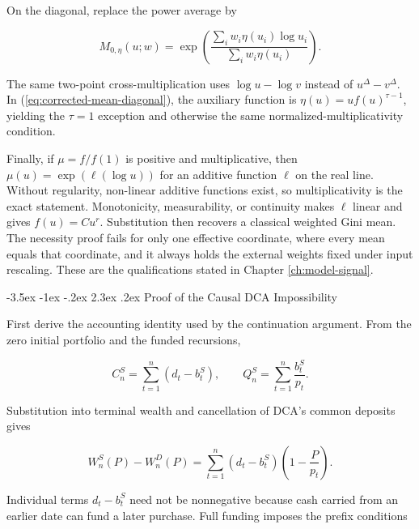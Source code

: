 \documentclass[12pt,a4paper,oneside]{report}
\makeatletter
\renewcommand\section{\@startsection{section}{1}{\z@}%
  {-3.5ex \@plus -1ex \@minus -.2ex}%
  {2.3ex \@plus .2ex}%
  {\normalfont\fontsize{14}{17}\selectfont\bfseries}}
\makeatother
\begin{document}
On the diagonal, replace the power average by

\begin{equation}
  M_{0,\eta}(u;w)
  =\exp\left(
    \frac{\sum_i w_i \eta(u_i)\log u_i}{\sum_i w_i \eta(u_i)}
  \right).
  \label{eq:homogeneity-diagonal-form}
\end{equation}

The same two-point cross-multiplication uses $\log u-\log v$ instead of
$u^\Delta-v^\Delta$. In (\ref{eq:corrected-mean-diagonal}), the auxiliary
function is $\eta(u)=u f(u)^{\tau-1}$, yielding the $\tau=1$ exception and otherwise
the same normalized-multiplicativity condition.

Finally, if $\mu=f/f(1)$ is positive and multiplicative, then
$\mu(u)=\exp(\ell(\log u))$ for an additive function $\ell$ on the real line.
Without regularity, non-linear additive functions exist, so multiplicativity
is the exact statement. Monotonicity, measurability, or continuity makes $\ell$
linear and gives $f(u)=Cu^r$. Substitution then recovers a classical weighted
Gini mean. The necessity proof fails for only one effective coordinate, where
every mean equals that coordinate, and it always holds the external weights
fixed under input rescaling. These are the qualifications stated in Chapter
\ref{ch:model-signal}.

\section{Proof of the Causal DCA Impossibility}
\label{sec:proof-dca-impossibility}

First derive the accounting identity used by the continuation argument. From
the zero initial portfolio and the funded recursions,

\begin{equation}
  C_n^S=\sum_{t=1}^{n}(d_t-b_t^S),
  \qquad
  Q_n^S=\sum_{t=1}^{n}\frac{b_t^S}{p_t}.
  \label{eq:proof-terminal-ledger}
\end{equation}

Substitution into terminal wealth and cancellation of DCA's common deposits
gives

\begin{equation}
  W_n^S(P)-W_n^D(P)
  =\sum_{t=1}^{n}(d_t-b_t^S)
    \left(1-\frac{P}{p_t}\right).
  \label{eq:appendix-dca-gap}
\end{equation}

Individual terms $d_t-b_t^S$ need not be nonnegative because cash carried from
an earlier date can fund a later purchase. Full funding imposes the prefix
conditions
\end{document}
